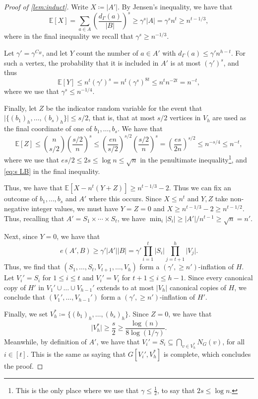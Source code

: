 \documentclass[11pt]{article}
\numberwithin{equation}{section}
\theoremstyle{plain}
\theoremstyle{remark}
\def\E{\mathbb{E}}
\newcommand\ab[1]{\lvert #1 \rvert}
\begin{document}
\begin{proof}[Proof of \cref{lem:induct}]
Write $X\coloneqq\ab{A'}$. By Jensen's inequality, we have that 
\[
\E[X] = \sum_{a\in A}\left(\frac{d_\Gamma(a)}{\ab B}\right)^s \ge \gamma^s \ab A = \gamma^s n^t\ge n^{t-1/3},
\]
where in the final inequality we recall that $\gamma^s \geq n^{-1/3}$.

Let $\gamma'=\gamma^{C_H}$, and let $Y$ count the number of $a\in A'$ with $d_\Gamma(a)\le \gamma' n^{h-t}$. For such a vertex, the probability that it is included in $A'$ is at most $(\gamma')^s$, and thus 
\[\E[Y]\le n^t(\gamma')^{s}=n^t (\gamma^s)^{8t} \leq n^t n^{-2t} = n^{-t},\]
where we use that $\gamma^s \leq n^{-1/4}$.

Finally, let $Z$ be the indicator random variable for the event that $\ab{\{(b_1)_h,\dots,(b_s)_h\}}\leq s/2$, that is, that at most $s/2$ vertices in $V_h$ are used as the final coordinate of one of $b_1,\dots,b_s$. We have that 
\[
\E[Z] \leq \binom{n}{s/2} \left(\frac{s/2}{n}\right)^s \leq \left(\frac{en}{s/2}\right)^{s/2} \left(\frac{s/2}{n}\right)^s = \left(\frac{es}{2n}\right)^{s/2} \leq n^{-s/4} \leq n^{-t},
\]
where we use that $es/2 \leq 2s \leq \log n \leq \sqrt n$ in the penultimate inequality\footnote{This is the only place where we use that $\gamma \leq \frac 12$, to say that $2s \leq \log n$.}, and \eqref{eq:s LB} in the final inequality.

Thus, we have that $\E[X-n^t(Y+Z)]\geq n^{t-1/3}-2$. Thus we can fix an outcome of $b_1,\dots,b_s$ and $A'$ where this occurs. Since $X\le n^t$ and $Y,Z$ take non-negative integer values, we must have $Y=Z =0$ and $X\ge n^{t-1/3}-2 \geq n^{t-1/2}$. Thus, recalling that $A' = S_1\times \dotsb \times S_t$, we have $\min_i\ab{S_i} \ge |A'|/n^{t-1} \ge \sqrt{n}=n'$. 

Next, since $Y=0$, we have that $$e(A',B)\ge \gamma'|A'||B| = \gamma' \prod_{i=1}^t\ab{S_i} \prod_{j=t+1}^{h}\ab{V_j}.$$ 
Thus, we find that $(S_1,\dots,S_t,V_{t+1},\dots,V_h)$ form a $(\gamma',\geq n')$-inflation of $H$. Let $V_i' = S_i$ for $1 \leq i \leq t$ and $V_i' = V_i$ for $t+1 \leq i \leq h-1$.
Since every canonical copy of $H'$ in $V_1' \cup \dots \cup V_{h-1}'$ extends to at most $\ab{V_h}$ canonical copies of $H$, we conclude that $(V_1',\dots,V_{h-1}')$ form a $(\gamma', \geq n')$-inflation of $H'$.


Finally, we set $V_h^*\coloneqq  \{(b_1)_h,\dots,(b_s)_h\}$. Since $Z =0$, we have that  
\[
\ab{V_h^*} \geq \frac{s}{2} \geq \frac{\log(n)}{8\log(1/\gamma)}.
\]
Meanwhile, by definition of $A'$, we have that $V_i'= S_i \subseteq \bigcap_{v\in V_h^*}N_G(v)$, for all $i \in [t]$. This is the same as saying that $G[V_i', V_h^*]$ is complete, which concludes the proof.    
\end{proof}
\end{document}
